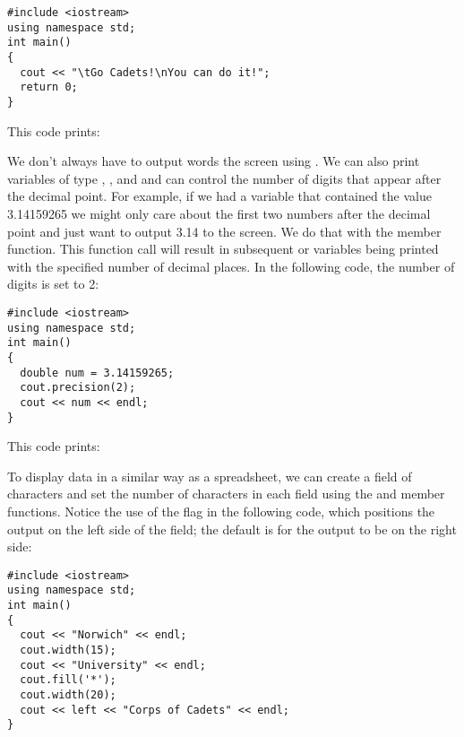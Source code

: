 \noindent\begin{minipage}{\linewidth}\begin{lstlisting}
#include <iostream>
using namespace std;
int main()
{
  cout << "\tGo Cadets!\nYou can do it!";
  return 0;
}
\end{lstlisting}\end{minipage}

\noindent This code prints: 


\noindent {}

We don't always have to output words the screen using . 
We can also print variables of type , , and  and can control the number of digits that appear after the decimal point. 
For example, if we had a variable that contained the value 3.14159265 we might only care about the first two numbers after the decimal point and just want to output 3.14 to the screen. 
We do that with the  member function. 
This function call will result in subsequent  or  variables being printed with the specified number of decimal places. 
In the following code, the number of digits is set to 2:

\noindent\begin{minipage}{\linewidth}\begin{lstlisting}
#include <iostream>
using namespace std;
int main()
{
  double num = 3.14159265;
  cout.precision(2);
  cout << num << endl;
}
\end{lstlisting}\end{minipage}

\noindent This code prints:

\noindent {}

To display data in a similar way as a spreadsheet, we can create a field of characters and set the number of characters in each field using the  and  member functions. 
Notice the use of the  flag in the following code, which positions the output on the left side of the field; the default is for the output to be on the right side:

\noindent\begin{minipage}{\linewidth}\begin{lstlisting}
#include <iostream>
using namespace std;
int main()
{
  cout << "Norwich" << endl;
  cout.width(15);
  cout << "University" << endl;
  cout.fill('*');
  cout.width(20);
  cout << left << "Corps of Cadets" << endl;
}
\end{lstlisting}\end{minipage}

